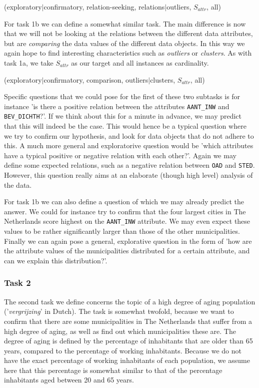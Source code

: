 (exploratory$|$confirmatory, relation-seeking, relations$|$outliers, $S_{attr}$, all)

For task 1b we can define a somewhat similar task. The main difference is now that we will not be looking at the relations between the different data attributes, but are \textit{comparing} the data values of the different data objects. In this way we again hope to find interesting characteristics such as \textit{outliers} or \textit{clusters}. As with task 1a, we take $S_{attr}$ as our target and all instances as cardinality.

(exploratory$|$confirmatory, comparison, outliers$|$clusters, $S_{attr}$, all)

Specific questions that we could pose for the first of these two subtasks is for instance 'is there a positive relation between the attributes \texttt{AANT\_INW} and \texttt{BEV\_DICHTH}?'. If we think about this for a minute in advance, we may predict that this will indeed be the case. This would hence be a typical question where we try to confirm our hypothesis, and look for data objects that do not adhere to this. A much more general and exploratorive question would be 'which attributes have a typical positive or negative relation with each other?'. Again we may define some expected relations, such as a negative relation between \texttt{OAD} and \texttt{STED}. However, this question really aims at an elaborate (though high level) analysis of the data.

For task 1b we can also define a question of which we may already predict the answer. We could for instance try to confirm that the four largest cities in The Netherlands score highest on the \texttt{AANT\_INW} attribute. We may even expect these values to be rather significantly larger than those of the other municipalities. Finally we can again pose a general, explorative question in the form of 'how are the attribute values of the municipalities distributed for a certain attribute, and can we explain this distribution?'.




\subsubsection{Task 2}\label{sec:task2}
The second task we define concerns the topic of a high degree of aging population ('\textit{vergrijzing}' in Dutch). The task is somewhat twofold, because we want to confirm that there are some municipalities in The Netherlands that suffer from a high degree of aging, as well as find out which municipalities these are. The degree of aging is defined by the percentage of inhabitants that are older than 65 years, compared to the percentage of working inhabitants. Because we do not have the exact percentage of working inhabitants of each population, we assume here that this percentage is somewhat similar to that of the percentage inhabitants aged between 20 and 65 years.

